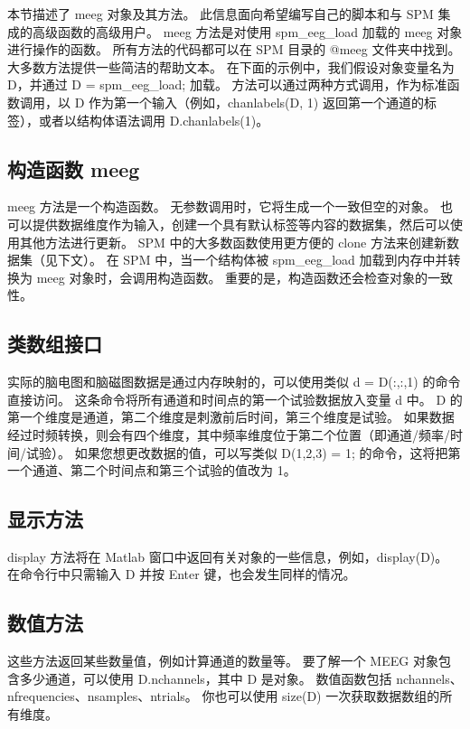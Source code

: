 本节描述了 meeg 对象及其方法。
此信息面向希望编写自己的脚本和与 SPM 集成的高级函数的高级用户。
meeg 方法是对使用 spm\_eeg\_load 加载的 meeg 对象进行操作的函数。
所有方法的代码都可以在 SPM 目录的 @meeg 文件夹中找到。
大多数方法提供一些简洁的帮助文本。
在下面的示例中，我们假设对象变量名为 D，并通过 D = spm\_eeg\_load; 加载。
方法可以通过两种方式调用，作为标准函数调用，以 D 作为第一个输入（例如，chanlabels(D, 1) 返回第一个通道的标签），或者以结构体语法调用 D.chanlabels(1)。


\subsection{构造函数 meeg}

meeg 方法是一个构造函数。
无参数调用时，它将生成一个一致但空的对象。
也可以提供数据维度作为输入，创建一个具有默认标签等内容的数据集，然后可以使用其他方法进行更新。
SPM 中的大多数函数使用更方便的 clone 方法来创建新数据集（见下文）。
在 SPM 中，当一个结构体被 spm\_eeg\_load 加载到内存中并转换为 meeg 对象时，会调用构造函数。
重要的是，构造函数还会检查对象的一致性。


\subsection{类数组接口}

实际的脑电图和脑磁图数据是通过内存映射的，可以使用类似 d = D(:,:,1) 的命令直接访问。
这条命令将所有通道和时间点的第一个试验数据放入变量 d 中。
D 的第一个维度是通道，第二个维度是刺激前后时间，第三个维度是试验。
如果数据经过时频转换，则会有四个维度，其中频率维度位于第二个位置（即通道/频率/时间/试验）。
如果您想更改数据的值，可以写类似 D(1,2,3) = 1; 的命令，这将把第一个通道、第二个时间点和第三个试验的值改为 1。


\subsection{显示方法}

display 方法将在 Matlab 窗口中返回有关对象的一些信息，例如，display(D)。
在命令行中只需输入 D 并按 Enter 键，也会发生同样的情况。


\subsection{数值方法}

这些方法返回某些数量值，例如计算通道的数量等。
要了解一个 MEEG 对象包含多少通道，可以使用 D.nchannels，其中 D 是对象。
数值函数包括 nchannels、nfrequencies、nsamples、ntrials。
你也可以使用 size(D) 一次获取数据数组的所有维度。


